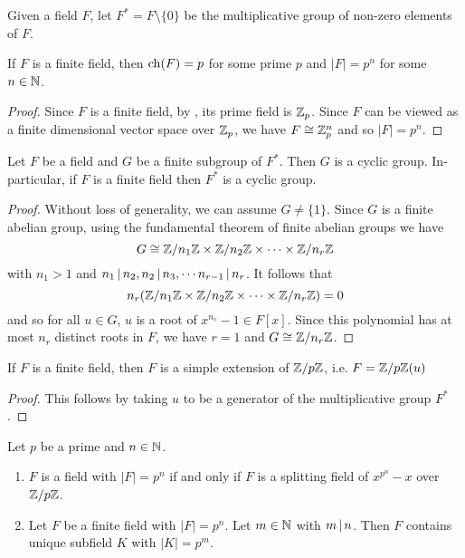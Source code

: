\documentclass[11pt]{article}
\begin{document}
\begin{notation}
    Given a field $F$, let $F^*=F\setminus\{0\}$ be the multiplicative group of non-zero elements of $F$.
\end{notation}

\begin{proposition}
    If $F$ is a finite field, then $\operatorname{ch}(F)=p$ for some prime $p$ and $|F|=p^n$ for some $n\in\mathbb{N}$.
\end{proposition}

\begin{proof}
    Since $F$ is a finite field, by , its prime field is $\mathbb{Z}_p$. Since $F$ can be viewed as a finite dimensional vector space over $\mathbb{Z}_p$, we have $F\cong\mathbb{Z}_p^n$ and so $|F|=p^n$.
\end{proof}

\begin{theorem}
    Let $F$ be a field and $G$ be a finite subgroup of $F^*$. Then $G$ is a cyclic group. In-particular, if $F$ is a finite field then $F^*$ is a cyclic group.
\end{theorem}

\begin{proof}
    Without loss of generality, we can assume $G\neq\{1\}$. Since $G$ is a finite abelian group, using the fundamental theorem of finite abelian groups we have
    \[G\cong\mathbb{Z}/n_1\mathbb{Z}\times\mathbb{Z}/n_2\mathbb{Z}\times\cdots\times\mathbb{Z}/n_r\mathbb{Z}\]
    with $n_1>1$ and $n_1\,|\, n_2,n_2\,|\, n_3,\cdots n_{r-1}\,|\, n_r$. It follows that
    \[n_r(\mathbb{Z}/n_1\mathbb{Z}\times\mathbb{Z}/n_2\mathbb{Z}\times\cdots\times\mathbb{Z}/n_r\mathbb{Z})=0\]
    and so for all $u\in G$, $u$ is a root of $x^{n_r}-1\in F[x]$. Since this polynomial has at most $n_r$ distinct roots in $F$, we have $r=1$ and $G\cong\mathbb{Z}/n_r\mathbb{Z}$.
    
\end{proof}

\begin{corollary}
    If $F$ is a finite field, then $F$ is a simple extension of $\mathbb{Z}/p\mathbb{Z}$, i.e. $F=\mathbb{Z}/p\mathbb{Z}(u)$
\end{corollary}

\begin{proof}
    This follows by taking $u$ to be a generator of the multiplicative group $F^*$.
    
\end{proof}

\begin{theorem}
    Let $p$ be a prime and $n\in\mathbb{N}$.
    \begin{enumerate}
        \item $F$ is a field with $|F|=p^n$ if and only if $F$ is a splitting field of $x^{p^n}-x$ over $\mathbb{Z}/p\mathbb{Z}$.
        \item Let $F$ be a finite field with $|F|=p^n$. Let $m\in\mathbb{N}$ with $m\,|\, n$. Then $F$ contains unique subfield $K$ with $|K|=p^m$.
    \end{enumerate}
\end{theorem}
\end{document}

